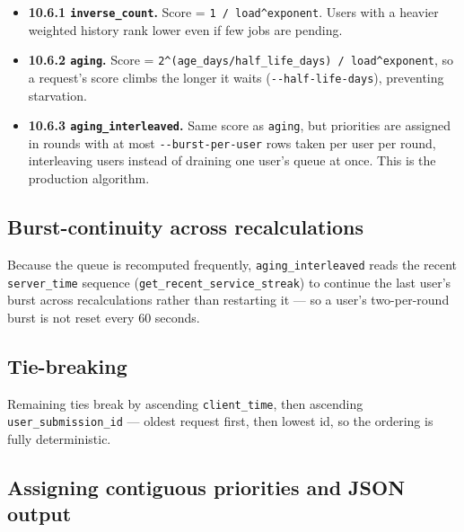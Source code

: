 \begin{itemize}
  \item \textbf{10.6.1 \texttt{inverse\_\allowbreak{}count}.} Score = \texttt{1 /\allowbreak{}
  load\textasciicircum{}exponent}. Users with a heavier weighted history rank lower even if few jobs are
  pending.
  \item \textbf{10.6.2 \texttt{aging}.} Score =
  \texttt{2\textasciicircum{}(age\_\allowbreak{}days/\allowbreak{}half\_\allowbreak{}life\_\allowbreak{}days)
  /\allowbreak{} load\textasciicircum{}exponent}, so a request's score climbs the longer it waits
  (\texttt{-\allowbreak{}-\allowbreak{}half-\allowbreak{}life-\allowbreak{}days}), preventing starvation.
  \item \textbf{10.6.3 \texttt{aging\_\allowbreak{}interleaved}.} Same score as \texttt{aging}, but priorities
  are assigned in rounds with at most
  \texttt{-\allowbreak{}-\allowbreak{}burst-\allowbreak{}per-\allowbreak{}user} rows taken per user per round,
  interleaving users instead of draining one user's queue at once. This is the production algorithm.
\end{itemize}

\subsection{Burst-continuity across recalculations}

Because the queue is recomputed frequently, \texttt{aging\_\allowbreak{}interleaved} reads the recent
\texttt{server\_\allowbreak{}time} sequence
(\texttt{get\_\allowbreak{}recent\_\allowbreak{}service\_\allowbreak{}streak}) to continue the last user's
burst across recalculations rather than restarting it --- so a user's two-per-round burst is not reset every 60
seconds.

\subsection{Tie-breaking}

Remaining ties break by ascending \texttt{client\_\allowbreak{}time}, then ascending
\texttt{user\_\allowbreak{}submission\_\allowbreak{}id} --- oldest request first, then lowest id, so the
ordering is fully deterministic.

\subsection{Assigning contiguous priorities and JSON output}

